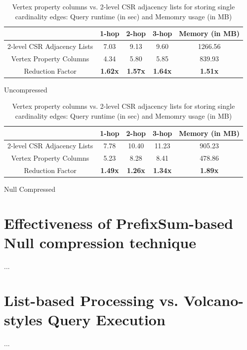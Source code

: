 \begin{table}
	\centering
	\begin{subtable}{1\textwidth}
		\centering
		\bgroup
		\setlength{\tabcolsep}{8pt}
		\def\arraystretch{1.2}%
		\begin{tabular}{ |c|c|c|c|c| }
			\hline
			& 1-hop & 2-hop & 3-hop & Memory (in MB) \\ 
			\hline
			2-level CSR Adjacency Lists& 7.03 & 9.13 & 9.60 & 1266.56 \\ 
			\hline
			Vertex Property Columns& 4.34 & 5.80 & 5.85 & 839.93 \\ 
			\hline \hline
			Reduction Factor& \textbf{1.62x} & \textbf{1.57x} & \textbf{1.64x} & \textbf{1.51x} \\ 
			\hline
		\end{tabular}
		\egroup
		\captionsetup{justification=centering}
		\caption{Uncompressed}
		\label{tbl:mem2}
	\end{subtable}
	\begin{subtable}{1\textwidth}
		\centering
		\bgroup
		\setlength{\tabcolsep}{8pt}
		\def\arraystretch{1.2}%
		\begin{tabular}{ |c|c|c|c|c| } 
			\hline
			& 1-hop & 2-hop & 3-hop & Memory (in MB) \\ 
			\hline
			2-level CSR Adjacency Lists& 7.78 & 10.40 & 11.23 & 905.23 \\ 
			\hline
			Vertex Property Columns& 5.23 & 8.28 & 8.41 & 478.86 \\ 
			\hline \hline
			Reduction Factor& \textbf{1.49x} & \textbf{1.26x} & \textbf{1.34x} & \textbf{1.89x} \\ 
			\hline
		\end{tabular}
		\egroup
		\captionsetup{justification=centering}
		\caption{Null Compressed}
		\label{tbl:mem2}
	\end{subtable}
	\captionsetup{justification=centering}
	\caption{Vertex property columns vs. 2-level CSR adjacency lists for storing single cardinality edges: Query runtime (in sec) and Memomry usage (in MB)  }
\end{table}

\section{Effectiveness of PrefixSum-based Null compression technique}
\label{exp:prefixSum}

...

\section{List-based Processing vs. Volcano-styles Query Execution}
\label{exp:list-based}

...
